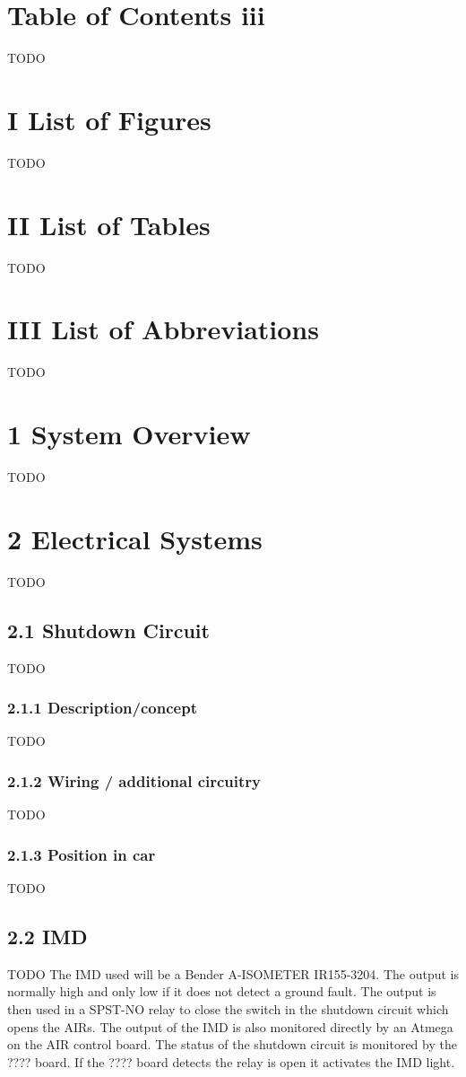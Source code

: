 \documentclass{article}
\begin{document}
\section*{Table of Contents iii}
TODO

\section*{I List of Figures}
TODO

\section*{II List of Tables}
TODO

\section*{III List of Abbreviations}
TODO

\section*{1 System Overview}
TODO

\section*{2 Electrical Systems}
TODO

\subsection*{2.1 Shutdown Circuit}
TODO

\subsubsection*{2.1.1 Description/concept}
TODO

\subsubsection*{2.1.2 Wiring / additional circuitry}
TODO

\subsubsection*{2.1.3 Position in car}
TODO

\subsection*{2.2 IMD}
TODO
The IMD used will be a Bender A-ISOMETER IR155-3204. The output is normally high and only low if it does not detect a ground fault. The output is then used in a SPST-NO relay to close the switch in the shutdown circuit which opens the AIRs. The output of the IMD is also monitored directly by an Atmega on the AIR control board. The status of the shutdown circuit is monitored by the ???? board. If the ???? board detects the relay is  open it activates the IMD light.
\end{document}
